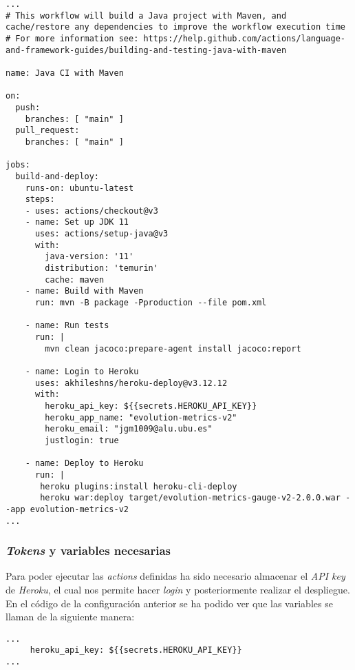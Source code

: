 \begin{minipage}{\linewidth}
{\tiny
\begin{verbatim}
...
# This workflow will build a Java project with Maven, and cache/restore any dependencies to improve the workflow execution time
# For more information see: https://help.github.com/actions/language-and-framework-guides/building-and-testing-java-with-maven

name: Java CI with Maven

on:
  push:
    branches: [ "main" ]
  pull_request:
    branches: [ "main" ]

jobs:
  build-and-deploy:
    runs-on: ubuntu-latest
    steps:
    - uses: actions/checkout@v3
    - name: Set up JDK 11
      uses: actions/setup-java@v3
      with:
        java-version: '11'
        distribution: 'temurin'
        cache: maven
    - name: Build with Maven
      run: mvn -B package -Pproduction --file pom.xml
 
    - name: Run tests
      run: | 
        mvn clean jacoco:prepare-agent install jacoco:report
        
    - name: Login to Heroku
      uses: akhileshns/heroku-deploy@v3.12.12
      with:
        heroku_api_key: ${{secrets.HEROKU_API_KEY}}
        heroku_app_name: "evolution-metrics-v2"
        heroku_email: "jgm1009@alu.ubu.es"
        justlogin: true
        
    - name: Deploy to Heroku
      run: |
       heroku plugins:install heroku-cli-deploy
       heroku war:deploy target/evolution-metrics-gauge-v2-2.0.0.war --app evolution-metrics-v2
...
\end{verbatim}
}
\end{minipage}


\subsubsection{\textit{Tokens} y variables necesarias}
Para poder ejecutar las \textit{actions} definidas ha sido necesario almacenar el \textit{API key} de \textit{Heroku}, el cual nos permite hacer \textit{login} y posteriormente realizar el despliegue. En el código de la configuración anterior se ha podido ver que las variables se llaman de la siguiente manera: 

\begin{minipage}{\linewidth}
{\tiny
\begin{verbatim}
...
     heroku_api_key: ${{secrets.HEROKU_API_KEY}}
...
\end{verbatim}
}
\end{minipage}

